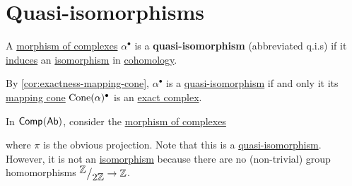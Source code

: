 \documentclass[../../../main]{subfiles}
\begin{document}
\section{Quasi-isomorphisms}

\begin{definition} \label{def:quasi-isomorphism}
  A \hyperref[def:complex-morphism]{morphism of complexes} \(\alpha^{\bullet}\) is a \textbf{quasi-isomorphism} (abbreviated q.i.s) if it \hyperref[thm:LES-in-cohomology]{induces} an \hyperref[def:categorical-isomorphism]{isomorphism} in \hyperref[def:cohomology]{cohomology}.
\end{definition}

\begin{remark}\label{rem:quasi-isomorphism-and-mapping-cone}
  By \autoref{cor:exactness-mapping-cone}, \(\alpha^{\bullet}\) is a \hyperref[def:quasi-isomorphism]{quasi-isomorphism} if and only it its \hyperref[def:mapping-cone]{mapping cone} \(\operatorname{Cone}(\alpha)^{\bullet}\) is an \hyperref[def:exact-complex]{exact complex}.
\end{remark}

\begin{example}
  In \(\mathsf{Comp}^{}(\mathsf{Ab})\), consider the \hyperref[def:complex-morphism]{morphism of complexes}
  \begin{center}
  \end{center}
  where \(\pi\) is the obvious projection.
  Note that this is a \hyperref[def:quasi-isomorphism]{quasi-isomorphism}.
  However, it is not an \hyperref[def:categorical-isomorphism]{isomorphism} because there are no (non-trivial) group homomorphisms \({^{\textstyle \mathbb{Z}}\big/_{\textstyle 2\mathbb{Z}}} \to \mathbb{Z}\).
\end{example}
\end{document}
